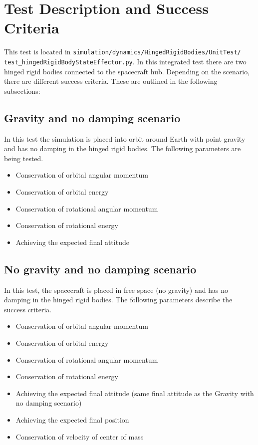 \section{Test Description and Success Criteria}
This test is located in \texttt{simulation/dynamics/HingedRigidBodies/UnitTest/\newline
test\_hingedRigidBodyStateEffector.py}. In this integrated test there are two hinged rigid bodies connected to the spacecraft hub.  Depending on the scenario, there are different success criteria. These are outlined in the following subsections:
\subsection{Gravity and no damping scenario}
In this test the simulation is placed into orbit around Earth with point gravity and has no damping in the hinged rigid bodies. The following parameters are being tested. 
\begin{itemize}
	\item Conservation of orbital angular momentum
	\item Conservation of orbital energy
	\item Conservation of rotational angular momentum
	\item Conservation of rotational energy
	\item Achieving the expected final attitude
\end{itemize}

\subsection{No gravity and no damping scenario}
In this test, the spacecraft is placed in free space (no gravity) and has no damping in the hinged rigid bodies. The following parameters describe the success criteria.
\begin{itemize}
\item Conservation of orbital angular momentum
\item Conservation of orbital energy
\item Conservation of rotational angular momentum
\item Conservation of rotational energy
\item Achieving the expected final attitude (same final attitude as the Gravity with no damping scenario)
\item Achieving the expected final position
\item Conservation of velocity of center of mass
\end{itemize}

